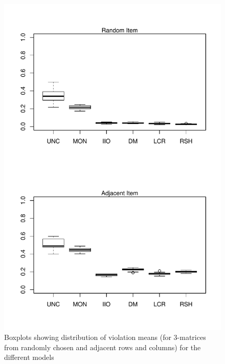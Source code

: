 \documentclass[12pt]{article}
\begin{document}
\begin{figure}
\centering
\caption{Boxplots showing distribution of violation means (for 3-matrices from randomly chosen and adjacent rows and columns) for the different models} \label{boxplots}
\includegraphics[height=\textheight]{./figs/boxplots}
\end{figure}
\end{document}
